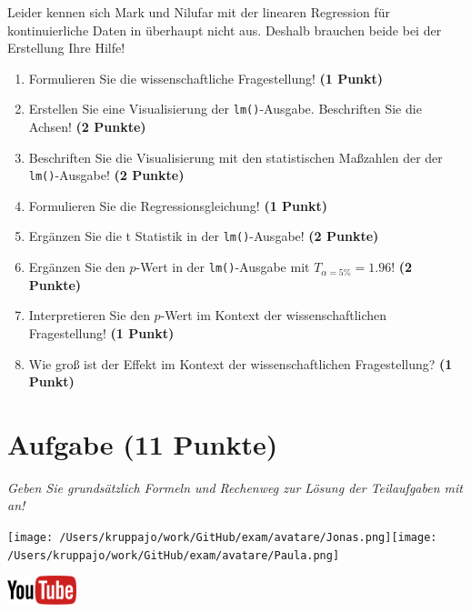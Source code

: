 \documentclass[a4paper, 9pt]{scrartcl}\usepackage[]{graphicx}\usepackage[]{xcolor}
\begin{document}
Leider kennen sich Mark und Nilufar mit der linearen Regression für kontinuierliche Daten in \Rlogo überhaupt nicht aus. Deshalb brauchen beide bei der Erstellung Ihre Hilfe!

\begin{enumerate}
\item Formulieren Sie die wissenschaftliche Fragestellung! \textbf{(1 Punkt)}
\item Erstellen  Sie  eine  Visualisierung  der \texttt{lm()}-Ausgabe.  Beschriften  Sie  die  Achsen! \textbf{(2 Punkte)}
\item Beschriften Sie die Visualisierung mit den statistischen Maßzahlen der der \texttt{lm()}-Ausgabe! \textbf{(2 Punkte)}
\item Formulieren Sie die Regressionsgleichung! \textbf{(1 Punkt)}
\item Ergänzen Sie die t Statistik in der \texttt{lm()}-Ausgabe! \textbf{(2 Punkte)}
\item Ergänzen Sie den $p$-Wert in der \texttt{lm()}-Ausgabe mit $T_{\alpha = 5\%} = 1.96$!  \textbf{(2 Punkte)}
\item Interpretieren Sie den $p$-Wert im Kontext der wissenschaftlichen Fragestellung! \textbf{(1 Punkt)}  
\item Wie groß ist der Effekt im Kontext der wissenschaftlichen Fragestellung? \textbf{(1 Punkt)}
\end{enumerate} 
\clearpage

\section{Aufgabe \hfill (11 Punkte)}

\textit{Geben Sie grundsätzlich Formeln und Rechenweg zur Lösung der Teilaufgaben mit an!} \\[1Ex]
 

 
\begin{minipage}[t]{0.5\textwidth}
\texttt{[image: /Users/kruppajo/work/GitHub/exam/avatare/Jonas.png]}\hspace{-4mm}\texttt{[image: /Users/kruppajo/work/GitHub/exam/avatare/Paula.png]}
\end{minipage}
\begin{minipage}[t]{0.5\textwidth}
\hfill
\href{https://youtu.be/tNNzcndrpSk}{\includegraphics[width = 2cm]{img/youtube}}
\end{minipage}
\vspace{1ex}
\end{document}
